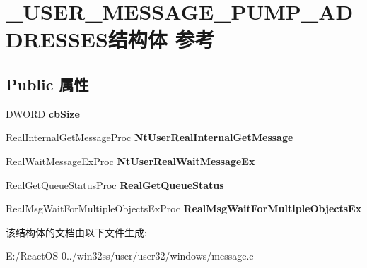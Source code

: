 \hypertarget{struct___u_s_e_r___m_e_s_s_a_g_e___p_u_m_p___a_d_d_r_e_s_s_e_s}{}\section{\+\_\+\+U\+S\+E\+R\+\_\+\+M\+E\+S\+S\+A\+G\+E\+\_\+\+P\+U\+M\+P\+\_\+\+A\+D\+D\+R\+E\+S\+S\+E\+S结构体 参考}
\label{struct___u_s_e_r___m_e_s_s_a_g_e___p_u_m_p___a_d_d_r_e_s_s_e_s}
\subsection*{Public 属性}
\begin{DoxyCompactItemize}
\item 
\mbox{\label{struct___u_s_e_r___m_e_s_s_a_g_e___p_u_m_p___a_d_d_r_e_s_s_e_s_ad294bdab4bae14cd0a90ca257a764304}} 
D\+W\+O\+RD {\bfseries cb\+Size}
\item 
\mbox{\label{struct___u_s_e_r___m_e_s_s_a_g_e___p_u_m_p___a_d_d_r_e_s_s_e_s_ac80e546ed5efd982431fd868fa353532}} 
Real\+Internal\+Get\+Message\+Proc {\bfseries Nt\+User\+Real\+Internal\+Get\+Message}
\item 
\mbox{\label{struct___u_s_e_r___m_e_s_s_a_g_e___p_u_m_p___a_d_d_r_e_s_s_e_s_afc524c75628b38b4dd08123486b8f361}} 
Real\+Wait\+Message\+Ex\+Proc {\bfseries Nt\+User\+Real\+Wait\+Message\+Ex}
\item 
\mbox{\label{struct___u_s_e_r___m_e_s_s_a_g_e___p_u_m_p___a_d_d_r_e_s_s_e_s_a350f54485be954231f76a884ae313ffe}} 
Real\+Get\+Queue\+Status\+Proc {\bfseries Real\+Get\+Queue\+Status}
\item 
\mbox{\label{struct___u_s_e_r___m_e_s_s_a_g_e___p_u_m_p___a_d_d_r_e_s_s_e_s_a0ceaeca0504bde768845bd464b5a7ce0}} 
Real\+Msg\+Wait\+For\+Multiple\+Objects\+Ex\+Proc {\bfseries Real\+Msg\+Wait\+For\+Multiple\+Objects\+Ex}
\end{DoxyCompactItemize}


该结构体的文档由以下文件生成\+:\begin{DoxyCompactItemize}
\item 
E\+:/\+React\+O\+S-\/0../win32ss/user/user32/windows/message.\+c\end{DoxyCompactItemize}
